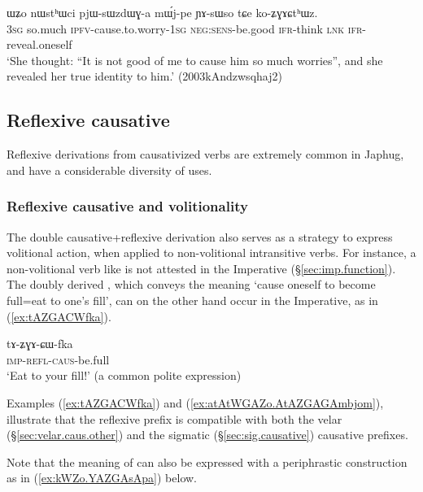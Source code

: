 \begin{exe}
\ex \label{ex:koZGACthWz}
\gll  ɯʑo nɯstʰɯci pjɯ-sɯzdɯɣ-a mɯ́j-pe ɲɤ-sɯso tɕe ko-ʑɣɤɕtʰɯz. \\
\textsc{3sg} so.much \textsc{ipfv}-cause.to.worry-\textsc{1sg} \textsc{neg}:\textsc{sens}-be.good \textsc{ifr}-think \textsc{lnk} \textsc{ifr}-reveal.oneself \\
\glt `She thought: ``It is not good of me to cause him so much worries'', and she revealed her true identity to him.' (2003kAndzwsqhaj2)
 \end{exe}
 
\subsection{Reflexive causative} \label{sec:refl.caus}
 
Reflexive derivations from causativized verbs are extremely common in Japhug, and have a considerable diversity of uses.

\subsubsection{Reflexive causative and volitionality}  \label{sec:refl.caus.volitional}
The double causative+reflexive derivation also serves as a strategy to express volitional action, when applied to non-volitional intransitive verbs. For instance, a non-volitional verb like  is not attested in the Imperative (§\ref{sec:imp.function}). The doubly derived , which conveys the meaning `cause oneself to become full=eat to one's fill', can on the other hand occur in the Imperative, as in (\ref{ex:tAZGACWfka}).

\begin{exe}
\ex \label{ex:tAZGACWfka}
\gll tɤ-ʑɣɤ-ɕɯ-fka \\
\textsc{imp}-\textsc{refl}-\textsc{caus}-be.full \\
\glt `Eat to your fill!' (a common polite expression)
 \end{exe}
 
Examples (\ref{ex:tAZGACWfka}) and (\ref{ex:atAtWGAZo.AtAZGAGAmbjom}), illustrate that the reflexive prefix is compatible with both the velar  (§\ref{sec:velar.caus.other}) and the sigmatic (§\ref{sec:sig.causative}) causative prefixes.  

 Note that the meaning of  can also be expressed with a periphrastic construction as in (\ref{ex:kWZo.YAZGAsApa}) below.
 
